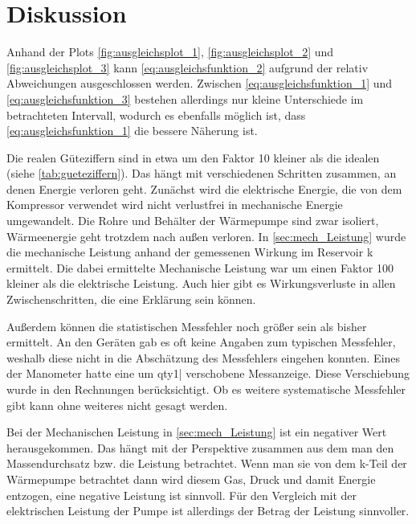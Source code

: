 \section{Diskussion}

Anhand der Plots \ref{fig:ausgleichsplot_1}, \ref{fig:ausgleichsplot_2} und \ref{fig:ausgleichsplot_3}
kann \eqref{eq:ausgleichsfunktion_2} aufgrund der relativ Abweichungen ausgeschlossen werden.
Zwischen \eqref{eq:ausgleichsfunktion_1} und \eqref{eq:ausgleichsfunktion_3} bestehen allerdings nur kleine Unterschiede
im betrachteten Intervall,
wodurch es ebenfalls möglich ist, dass \eqref{eq:ausgleichsfunktion_1} die bessere Näherung ist. 

Die realen Güteziffern sind in etwa um den Faktor 10 kleiner als die idealen (siehe \ref{tab:gueteziffern}).
Das hängt mit verschiedenen Schritten zusammen, an denen Energie verloren geht.
Zunächst wird die elektrische Energie, die von dem Kompressor verwendet wird
nicht verlustfrei in mechanische Energie umgewandelt.
Die Rohre und Behälter der Wärmepumpe sind zwar isoliert, 
Wärmeenergie geht trotzdem nach außen verloren.
In \ref{sec:mech_Leistung} wurde die mechanische Leistung anhand der gemessenen Wirkung im Reservoir k   ermittelt.
Die dabei ermittelte Mechanische Leistung war um einen Faktor 100 kleiner als die elektrische Leistung.
Auch hier gibt es Wirkungsverluste in allen Zwischenschritten, die eine Erklärung sein können.

Außerdem können die statistischen Messfehler noch größer sein als bisher ermittelt.
An den Geräten gab es oft keine Angaben zum typischen Messfehler,
weshalb diese nicht in die Abschätzung des Messfehlers eingehen konnten.
Eines der Manometer hatte eine um qty{1}{\bar} verschobene Messanzeige.
Diese Verschiebung wurde in den Rechnungen berücksichtigt.
Ob es weitere systematische Messfehler gibt kann ohne weiteres nicht gesagt werden.

Bei der Mechanischen Leistung in \ref{sec:mech_Leistung} ist ein negativer Wert herausgekommen. 
Das hängt mit der Perspektive zusammen aus dem man den Massendurchsatz bzw. die Leistung betrachtet.
Wenn man sie von dem k-Teil der Wärmepumpe betrachtet dann wird diesem Gas, Druck und damit Energie entzogen,
eine negative Leistung ist sinnvoll.
Für den Vergleich mit der elektrischen Leistung der Pumpe ist allerdings der Betrag der Leistung sinnvoller.